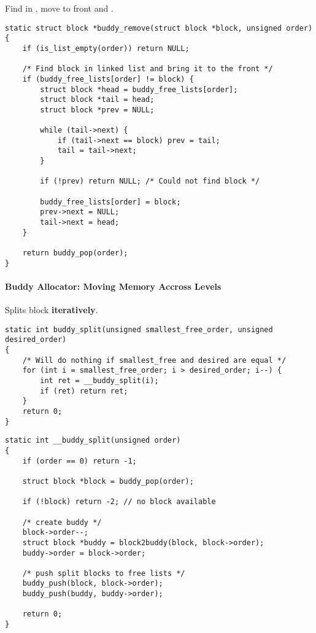 Find  in  , move to front and .
\begin{lstlisting}[style=bright_C++]
static struct block *buddy_remove(struct block *block, unsigned order)
{
	if (is_list_empty(order)) return NULL;

	/* Find block in linked list and bring it to the front */
	if (buddy_free_lists[order] != block) {
		struct block *head = buddy_free_lists[order];
		struct block *tail = head;
		struct block *prev = NULL;

		while (tail->next) {
			if (tail->next == block) prev = tail;
			tail = tail->next;
		}

		if (!prev) return NULL; /* Could not find block */

		buddy_free_lists[order] = block;
		prev->next = NULL;
		tail->next = head;
	}

	return buddy_pop(order);
}
\end{lstlisting}

\paragraph{Buddy Allocator: Moving Memory Accross Levels}

Splits block \textbf{iteratively}.
\begin{lstlisting}[style=bright_C++]
static int buddy_split(unsigned smallest_free_order, unsigned desired_order)
{
	/* Will do nothing if smallest_free and desired are equal */
	for (int i = smallest_free_order; i > desired_order; i--) {
		int ret = __buddy_split(i);
		if (ret) return ret;
	}
	return 0;
}
\end{lstlisting}

\newpar{}
\begin{lstlisting}[style=bright_C++]
static int __buddy_split(unsigned order)
{
    if (order == 0) return -1;

    struct block *block = buddy_pop(order);

    if (!block) return -2; // no block available

    /* create buddy */
    block->order--;
    struct block *buddy = block2buddy(block, block->order);
    buddy->order = block->order;

    /* push split blocks to free lists */
    buddy_push(block, block->order);
    buddy_push(buddy, buddy->order);

    return 0;
}
\end{lstlisting}

